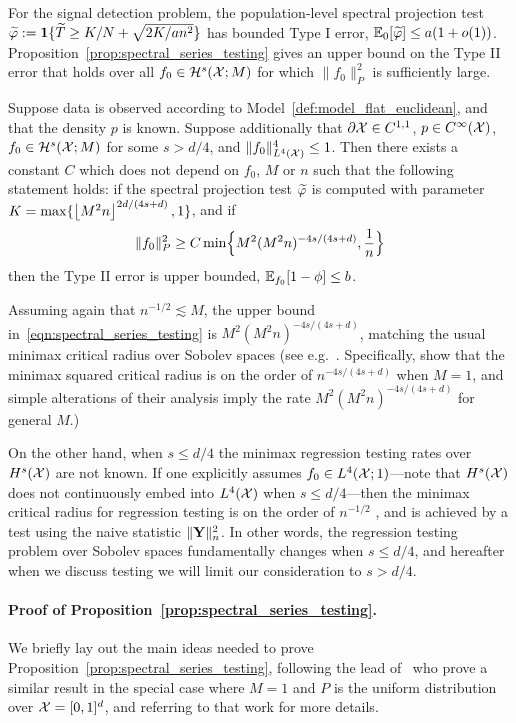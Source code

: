 For the signal detection problem, the population-level spectral projection test $\widetilde{\varphi} := \mathbf{1}\{\widetilde{T} \geq K/N + \sqrt{2K/an^2}\}$ has bounded Type I error, $\mathbb{E}_{0}[\widetilde{\varphi}] \leq a (1 + o(1))$. Proposition~\ref{prop:spectral_series_testing} gives an upper bound on the Type II error that holds over all $f_0 \in \mathcal{H}^s(\mathcal{X};M)$ for which $\|f_0\|_P^2$ is sufficiently large.
\begin{proposition}
	\label{prop:spectral_series_testing}
	Suppose data is observed according to Model~\ref{def:model_flat_euclidean}, and that the density $p$ is known.  Suppose additionally that $\partial \mathcal{X} \in C^{1,1}$, $p \in C^{\infty}(\mathcal{X})$, $f_0 \in \mathcal{H}^{s}(\mathcal{X};M)$ for some $s > d/4$, and $\|f_0\|_{L^4(\mathcal{X})}^4 \leq 1$. Then there exists a constant $C$ which does not depend on $f_0$, $M$ or $n$ such that the following statement holds: if the spectral projection test $\widetilde{\varphi}$ is computed with parameter $K = \max\{\left\lfloor M^2n \right\rfloor^{2d/(4s + d)},1\}$, and if
	\begin{equation}
	\label{eqn:spectral_series_testing}
	\|f_0\|_P^2 \geq C\min\Bigl\{M^2(M^2n)^{-4s/(4s + d)}, \frac{1}{n}\Bigr\}
	\end{equation}
	then the Type II error is upper bounded, $\mathbb{E}_{f_0}[1 - \phi] \leq b$.
\end{proposition}
Assuming again that $n^{-1/2} \lesssim M$, the upper bound in~\eqref{eqn:spectral_series_testing} is $M^2(M^2n)^{-4s/(4s + d)}$, matching the usual minimax critical radius over Sobolev spaces (see e.g.~\cite{guerre02,ingster2009,ingster2012}. Specifically, \cite{ingster2009} show that the minimax squared critical radius is on the order of $n^{-4s/(4s + d)}$ when $M = 1$, and simple alterations of their analysis imply the rate $M^2(M^2n)^{-4s/(4s + d)}$ for general $M$.) 

On the other hand, when $s \leq d/4$ the minimax regression testing rates over $H^s(\mathcal{X})$ are not known. If one explicitly assumes $f_0 \in L^4(\mathcal{X};1)$---note that $H^s(\mathcal{X})$ does not continuously embed into $L^4(\mathcal{X})$ when $s \leq d/4$---then the minimax critical radius for regression testing is on the order of $n^{-1/2}$ \citep{guerre02}, and is achieved by a test using the naive statistic $\|{\bf Y}\|_n^2$. In other words, the regression testing problem over Sobolev spaces fundamentally changes when $s \leq d/4$, and hereafter when we discuss testing we will limit our consideration to $s > d/4$. 
\paragraph{Proof of Proposition~\ref{prop:spectral_series_testing}.}
We briefly lay out the main ideas needed to prove Proposition~\ref{prop:spectral_series_testing}, following the lead of~\cite{ingster2009} who prove a similar result in the special case where $M = 1$ and $P$ is the uniform distribution over $\mathcal{X} = [0,1]^d$, and referring to that work for more details.

